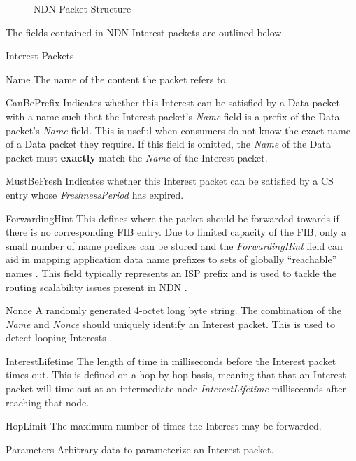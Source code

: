 \begin{figure}[H]
    \centering
    \caption{NDN Packet Structure \cite{ndn}}
    \label{fig:ndn-packet-structure}
\end{figure}

The fields contained in NDN Interest packets are outlined below.
\begin{labeling}{Interest Packets}
    \item [Name] The name of the content the packet refers to.
    \item [CanBePrefix] Indicates whether this Interest can be satisfied by a Data packet with a name such that the Interest packet's \textit{Name} field is a prefix of the Data packet's \textit{Name} field. This is useful when consumers do not know the exact name of a Data packet they require. If this field is omitted, the \textit{Name} of the Data packet must \textbf{exactly} match the \textit{Name} of the Interest packet. 
    \item [MustBeFresh] Indicates whether this Interest packet can be satisfied by a CS entry whose \textit{FreshnessPeriod} has expired.
    \item [ForwardingHint] This defines where the packet should be forwarded towards if there is no corresponding FIB entry. Due to limited capacity of the FIB, only a small number of name prefixes can be stored and the \textit{ForwardingHint} field can aid in mapping application data name prefixes to sets of globally “reachable” names \cite{ndn-dns}. This field typically represents an ISP prefix and is used to tackle the routing scalability issues present in NDN \cite{ndn-forwarding-hint}.
    \item [Nonce] A randomly generated 4-octet long byte string. The combination of the \textit{Name} and \textit{Nonce} should uniquely identify an Interest packet. This is used to detect looping Interests \cite{ndn-packet-spec}.
    \item [InterestLifetime] The length of time in milliseconds before the Interest packet times out. This is defined on a hop-by-hop basis, meaning that that an Interest packet will time out at an intermediate node \textit{InterestLifetime} milliseconds after reaching that node.
    \item [HopLimit] The maximum number of times the Interest may be forwarded.
    \item [Parameters] Arbitrary data to parameterize an Interest packet.
\end{labeling}

